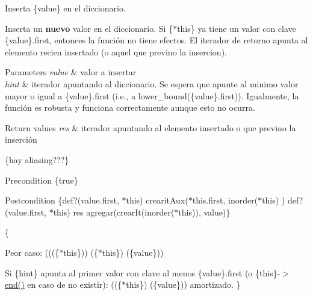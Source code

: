 \-Inserta \{value\} en el diccionario. 

\-Inserta un {\bfseries nuevo} valor en el diccionario. \-Si \{$\ast$this\} ya tiene un valor con clave \{value\}.first, entonces la función no tiene efectos. \-El iterador de retorno apunta al elemento recien insertado (o aquel que previno la insercion).


\begin{DoxyParams}{\-Parameters}
{\em value} & valor a insertar \\
\hline
{\em hint} & iterador apuntando al diccionario. \-Se espera que apunte al minimo valor mayor o igual a \{value\}.first (i.\-e., a lower\-\_\-bound(\{value\}.first)). \-Igualmente, la función es robusta y funciona correctamente aunque esto no ocurra. \\
\hline
\end{DoxyParams}

\begin{DoxyRetVals}{\-Return values}
{\em res} & iterador apuntando al elemento insertado o que previno la inserción\\
\hline
\end{DoxyRetVals}
\{hay aliasing???\}

\begin{DoxyPrecond}{\-Precondition}
\{true\} 
\end{DoxyPrecond}
\begin{DoxyPostcond}{\-Postcondition}
\{def?(value.\-first, $\ast$this)  crearit\-Aux($\ast$this.first, inorder($\ast$this) )   def?(value.\-first, $\ast$this)  res  agregar(crear\-It(inorder($\ast$this)), value)\}
\end{DoxyPostcond}
\{
\begin{DoxyItemize}
\item \-Peor caso\-: (((\{$\ast$this\}))  (\{$\ast$this\})  (\{value\}))
\item \-Si \{hint\} apunta al primer valor con clave al menos \{value\}.first (o \{this\}-\/$>$\hyperlink{classaed2_1_1iterator_a67caf9468be999e9be96b7add5d79946}{end()} en caso de no existir)\-: ((\{$\ast$this\})  (\{value\})) amortizado. \}
\end{DoxyItemize}

